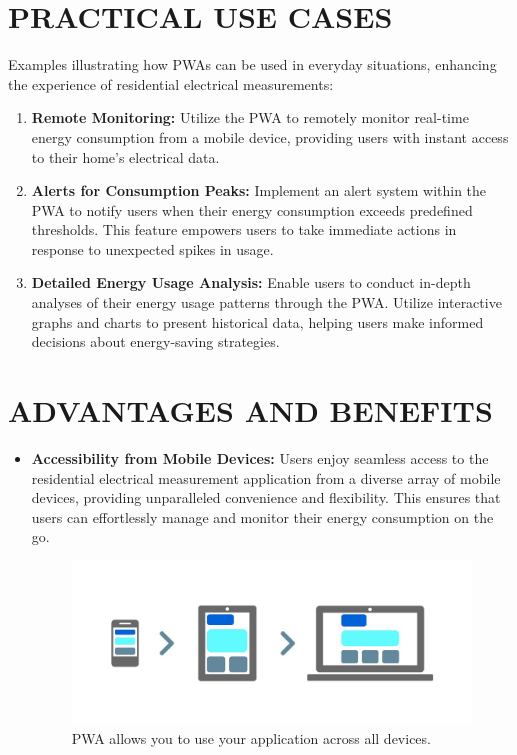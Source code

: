 \documentclass{article}
\begin{document}
\begin{multicols}{2}
\section*{PRACTICAL USE CASES}
Examples illustrating how PWAs can be used in everyday situations, enhancing the experience of residential electrical measurements:

\begin{enumerate}
    \item \textbf{Remote Monitoring:} Utilize the PWA to remotely monitor real-time energy consumption from a mobile device, providing users with instant access to their home's electrical data.
    
    \item \textbf{Alerts for Consumption Peaks:} Implement an alert system within the PWA to notify users when their energy consumption exceeds predefined thresholds. This feature empowers users to take immediate actions in response to unexpected spikes in usage.
    
    \item \textbf{Detailed Energy Usage Analysis:} Enable users to conduct in-depth analyses of their energy usage patterns through the PWA. Utilize interactive graphs and charts to present historical data, helping users make informed decisions about energy-saving strategies.
\end{enumerate}

\section*{ADVANTAGES AND BENEFITS}
\begin{itemize}
    \item \textbf{Accessibility from Mobile Devices:} Users enjoy seamless access to the residential electrical measurement application from a diverse array of mobile devices, providing unparalleled convenience and flexibility. This ensures that users can effortlessly manage and monitor their energy consumption on the go.
    
    \begin{figure}[H]
        \centering
        \includegraphics[width=0.8\linewidth]{images/mobile-first.jpg}  %
        \caption{PWA allows you to use your application across all devices.}
    \end{figure}


\end{itemize}
\end{multicols}
\end{document}
